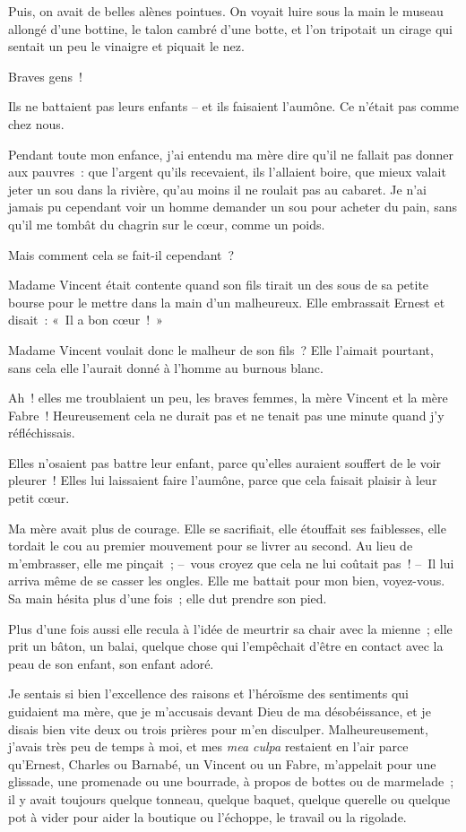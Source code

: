 \documentclass[french,twoside]{book} %
\begin{document}
Puis, on avait de belles alènes pointues. On voyait luire sous la main le museau allongé d’une bottine, le talon cambré d’une botte, et l’on tripotait un cirage qui sentait un peu le vinaigre et piquait le nez.\par
Braves gens !\par
Ils ne battaient pas leurs enfants – et ils faisaient l’aumône. Ce n’était pas comme chez nous.\par
\bigbreak
\noindent Pendant toute mon enfance, j’ai entendu ma mère dire qu’il ne fallait pas donner aux pauvres : que l’argent qu’ils recevaient, ils l’allaient boire, que mieux valait jeter un sou dans la rivière, qu’au moins il ne roulait pas au cabaret. Je n’ai jamais pu cependant voir un homme demander un sou pour acheter du pain, sans qu’il me tombât du chagrin sur le cœur, comme un poids.\par
Mais comment cela se fait-il cependant ?\par
Madame Vincent était contente quand son fils tirait un des sous de sa petite bourse pour le mettre dans la main d’un malheureux. Elle embrassait Ernest et disait : « Il a bon cœur ! »\par
Madame Vincent voulait donc le malheur de son fils ? Elle l’aimait pourtant, sans cela elle l’aurait donné à l’homme au burnous blanc.\par
Ah ! elles me troublaient un peu, les braves femmes, la mère Vincent et la mère Fabre ! Heureusement cela ne durait pas et ne tenait pas une minute quand j’y réfléchissais.\par
Elles n’osaient pas battre leur enfant, parce qu’elles auraient souffert de le voir pleurer ! Elles lui laissaient faire l’aumône, parce que cela faisait plaisir à leur petit cœur.\par
Ma mère avait plus de courage. Elle se sacrifiait, elle étouffait ses faiblesses, elle tordait le cou au premier mouvement pour se livrer au second. Au lieu de m’embrasser, elle me pinçait ; – vous croyez que cela ne lui coûtait pas ! – Il lui arriva même de se casser les ongles. Elle me battait pour mon bien, voyez-vous. Sa main hésita plus d’une fois ; elle dut prendre son pied.\par
Plus d’une fois aussi elle recula à l’idée de meurtrir sa chair avec la mienne ; elle prit un bâton, un balai, quelque chose qui l’empêchait d’être en contact avec la peau de son enfant, son enfant adoré.\par
Je sentais si bien l’excellence des raisons et l’héroïsme des sentiments qui guidaient ma mère, que je m’accusais devant Dieu de ma désobéissance, et je disais bien vite deux ou trois prières pour m’en disculper. Malheureusement, j’avais très peu de temps à moi, et mes \emph{mea culpa} restaient en l’air parce qu’Ernest, Charles ou Barnabé, un Vincent ou un Fabre, m’appelait pour une glissade, une promenade ou une bourrade, à propos de bottes ou de marmelade ; il y avait toujours quelque tonneau, quelque baquet, quelque querelle ou quelque pot à vider pour aider la boutique ou l’échoppe, le travail ou la rigolade.\par
\end{document}
